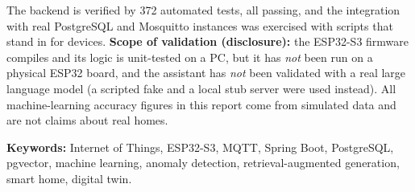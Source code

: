 \documentclass[12pt,a4paper,oneside]{report}
\begin{document}
The backend is verified by 372 automated tests, all passing, and the integration with real PostgreSQL and Mosquitto instances was exercised with scripts that stand in for devices.
\textbf{Scope of validation (disclosure):} the ESP32-S3 firmware compiles and its logic is unit-tested on a PC, but it has \emph{not} been run on a physical ESP32 board, and the assistant has \emph{not} been validated with a real large language model (a scripted fake and a local stub server were used instead). All machine-learning accuracy figures in this report come from simulated data and are not claims about real homes.

\medskip
\textbf{Keywords:} Internet of Things, ESP32-S3, MQTT, Spring Boot, PostgreSQL, pgvector, machine learning, anomaly detection, retrieval-augmented generation, smart home, digital twin.

\tableofcontents
\clearpage
\listoffigures
\clearpage
\listoftables
\clearpage

\end{document}
